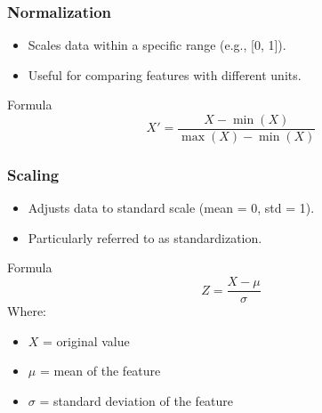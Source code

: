 \documentclass[aspectratio=169]{beamer}
\begin{document}
\begin{frame}[fragile]
    \frametitle{Normalization}
    \begin{itemize}
        \item Scales data within a specific range (e.g., [0, 1]).
        \item Useful for comparing features with different units.
    \end{itemize}
    \begin{block}{Formula}
        \[
        X' = \frac{X - \min(X)}{\max(X) - \min(X)}
        \]
    \end{block}
\end{frame}

\begin{frame}[fragile]
    \frametitle{Scaling}
    \begin{itemize}
        \item Adjusts data to standard scale (mean = 0, std = 1).
        \item Particularly referred to as standardization.
    \end{itemize}
    \begin{block}{Formula}
        \[
        Z = \frac{X - \mu}{\sigma}
        \]
        Where:
        \begin{itemize}
            \item \(X\) = original value
            \item \(\mu\) = mean of the feature
            \item \(\sigma\) = standard deviation of the feature
        \end{itemize}
    \end{block}
\end{frame}
\end{document}
